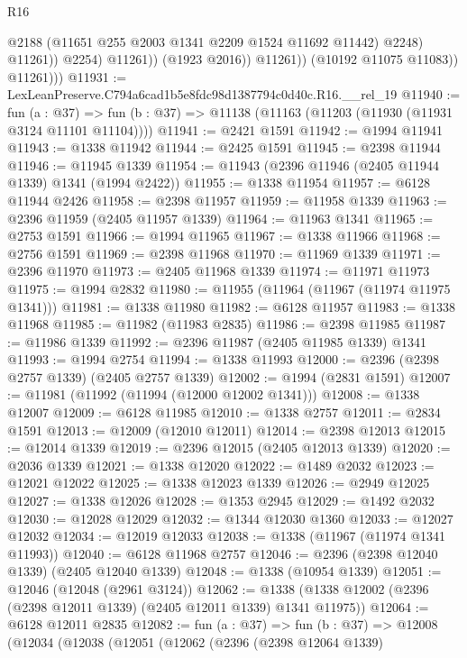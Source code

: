 \begin{lexlean}{R16}
\begin{coremodule}
                              @2188
                              (@11651 @255 @2003 @1341 @2209 @1524 @11692 @11442)
                              @2248)
                            @11261))
                        @2254)
                      @11261))
                  (@1923 @2016))
                @11261))
            (@10192 @11075 @11083))
          @11261)))
@11931 := LexLeanPreserve.C794a6cad1b5e8fdc98d1387794c0d40c.R16.__rel_19
@11940 := fun (a : @37) =>
  fun (b : @37) => @11138 (@11163 (@11203 (@11930 (@11931 @3124 @11101 @11104))))
@11941 := @2421 @1591
@11942 := @1994 @11941
@11943 := @1338 @11942
@11944 := @2425 @1591
@11945 := @2398 @11944
@11946 := @11945 @1339
@11954 := @11943 (@2396 @11946 (@2405 @11944 @1339) @1341 (@1994 @2422))
@11955 := @1338 @11954
@11957 := @6128 @11944 @2426
@11958 := @2398 @11957
@11959 := @11958 @1339
@11963 := @2396 @11959 (@2405 @11957 @1339)
@11964 := @11963 @1341
@11965 := @2753 @1591
@11966 := @1994 @11965
@11967 := @1338 @11966
@11968 := @2756 @1591
@11969 := @2398 @11968
@11970 := @11969 @1339
@11971 := @2396 @11970
@11973 := @2405 @11968 @1339
@11974 := @11971 @11973
@11975 := @1994 @2832
@11980 := @11955 (@11964 (@11967 (@11974 @11975 @1341)))
@11981 := @1338 @11980
@11982 := @6128 @11957
@11983 := @1338 @11968
@11985 := @11982 (@11983 @2835)
@11986 := @2398 @11985
@11987 := @11986 @1339
@11992 := @2396 @11987 (@2405 @11985 @1339) @1341
@11993 := @1994 @2754
@11994 := @1338 @11993
@12000 := @2396 (@2398 @2757 @1339) (@2405 @2757 @1339)
@12002 := @1994 (@2831 @1591)
@12007 := @11981 (@11992 (@11994 (@12000 @12002 @1341)))
@12008 := @1338 @12007
@12009 := @6128 @11985
@12010 := @1338 @2757
@12011 := @2834 @1591
@12013 := @12009 (@12010 @12011)
@12014 := @2398 @12013
@12015 := @12014 @1339
@12019 := @2396 @12015 (@2405 @12013 @1339)
@12020 := @2036 @1339
@12021 := @1338 @12020
@12022 := @1489 @2032
@12023 := @12021 @12022
@12025 := @1338 @12023 @1339
@12026 := @2949 @12025
@12027 := @1338 @12026
@12028 := @1353 @2945
@12029 := @1492 @2032
@12030 := @12028 @12029
@12032 := @1344 @12030 @1360
@12033 := @12027 @12032
@12034 := @12019 @12033
@12038 := @1338 (@11967 (@11974 @1341 @11993))
@12040 := @6128 @11968 @2757
@12046 := @2396 (@2398 @12040 @1339) (@2405 @12040 @1339)
@12048 := @1338 (@10954 @1339)
@12051 := @12046 (@12048 (@2961 @3124))
@12062 := @1338 (@1338 @12002 (@2396 (@2398 @12011 @1339) (@2405 @12011 @1339) @1341 @11975))
@12064 := @6128 @12011 @2835
@12082 := fun (a : @37) =>
  fun (b : @37) =>
  @12008
    (@12034
      (@12038
        (@12051
          (@12062
            (@2396
              (@2398 @12064 @1339)

\end{coremodule}
\end{lexlean}

